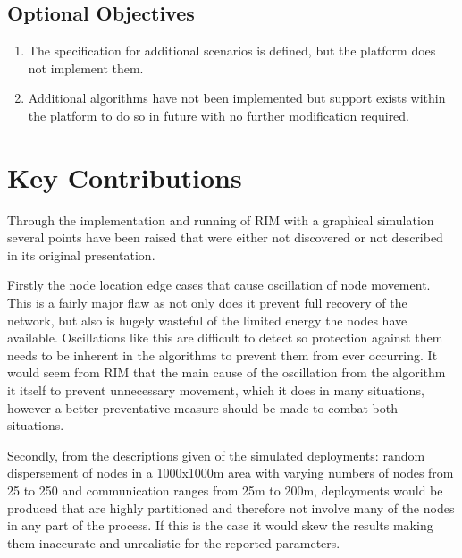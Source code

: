 \documentclass[authoryearcitations]{UoYCSproject}
\begin{document}
\subsection{Optional Objectives}
\begin{enumerate}
\item The specification for additional scenarios is defined, but the platform does not implement them.
\item Additional algorithms have not been implemented but support exists within the platform to do so in future with no further modification required.
\end{enumerate}

\section{Key Contributions}
\label{sec:keyContrib}

Through the implementation and running of RIM with a graphical simulation several points have been raised that were either not discovered or not described in its original presentation.

Firstly the node location edge cases that cause oscillation of node movement. This is a fairly major flaw as not only does it prevent full recovery of the network, but also is hugely wasteful of the limited energy the nodes have available. Oscillations like this are difficult to detect so protection against them needs to be inherent in the algorithms to prevent them from ever occurring. It would seem from RIM that the main cause of the oscillation from the algorithm it itself to prevent unnecessary movement, which it does in many situations, however a better preventative measure should be made to combat both situations.

Secondly, from the descriptions given of the simulated deployments: random dispersement of nodes in a 1000x1000m area with varying numbers of nodes from 25 to 250 and communication ranges from 25m to 200m, deployments would be produced that are highly partitioned and therefore not involve many of the nodes in any part of the process. If this is the case it would skew the results making them inaccurate and unrealistic for the reported parameters.
\end{document}
